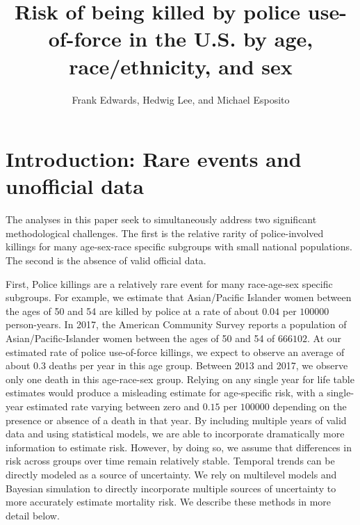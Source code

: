 \documentclass{article}
\title{Risk of being killed by police use-of-force in the U.S. by age, race/ethnicity, and sex}
\author{Frank Edwards, Hedwig Lee, and Michael Esposito}
\begin{document}
\maketitle


\section*{Introduction: Rare events and unofficial data}

The analyses in this paper seek to simultaneously address two significant methodological challenges. The first is the relative rarity of police-involved killings for many age-sex-race specific subgroups with small national populations. The second is the absence of valid official data. 

First, Police killings are a relatively rare event for many race-age-sex specific subgroups. For example, we estimate that Asian/Pacific Islander women between the ages of 50 and 54 are killed by police at a rate of about $0.04$ per $100000$ person-years. In 2017, the American Community Survey reports a population of Asian/Pacific-Islander women between the ages of 50 and 54 of $666102$. At our estimated rate of police use-of-force killings, we expect to observe an average of about 0.3 deaths per year in this age group. Between 2013 and 2017, we observe only one death in this age-race-sex group. Relying on any single year for life table estimates would produce a misleading estimate for age-specific risk, with a single-year estimated rate varying between zero and $0.15$ per $100000$ depending on the presence or absence of a death in that year. By including multiple years of valid data and using statistical models, we are able to incorporate dramatically more information to estimate risk. However, by doing so, we assume that differences in risk across groups over time remain relatively stable. Temporal trends can be directly modeled as a source of uncertainty. We rely on multilevel models and Bayesian simulation to directly incorporate multiple sources of uncertainty to more accurately estimate mortality risk. We describe these methods in more detail below.
\end{document}
